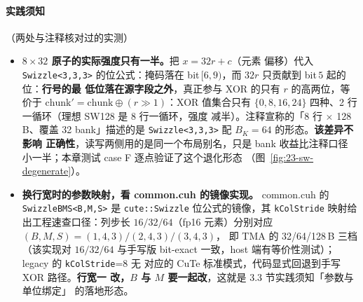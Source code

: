 \paragraph{实践须知}（两处与注释核对过的实测）
\begin{itemize}
  \item \textbf{$8\times32$ 原子的实际强度只有一半。}把 $x=32r+c$（元素
        偏移）代入 \texttt{Swizzle\allowbreak{}<3,\allowbreak{}3,\allowbreak{}3>} 的位公式：掩码落在
        bit$\,[6,9)$，而 $32r$ 只贡献到 bit$\,5$ 起的位：\textbf{行号的最
        低位落在源字段之外}，真正参与 XOR 的只有 $r$ 的高两位，等价于
        $\text{chunk}'=\text{chunk}\oplus(r\gg1)$：XOR 值集合只有
        $\{0,8,16,24\}$ 四种、2 行一循环（理想 SW128 是 8 行一循环，强度
        减半）。注释宣称的「8 行 $\times$ 128\,B、覆盖 32 bank」描述的是
        \texttt{Swizzle\allowbreak{}<3,\allowbreak{}3,\allowbreak{}3>} 配 $B_K=64$ 的形态。\textbf{该差异不影响
        正确性}，读写两侧用的是同一个布局别名，只是 bank 收益比注释口径
        小一半；本章测试 case F 逐点验证了这个退化形态
        （图~\ref{fig:23-sw-degenerate}）。
  \item \textbf{换行宽时的参数映射，看 common.cuh 的镜像实现。}
        common.cuh 的 \texttt{Swizzle\allowbreak{}BMS\allowbreak{}<B,\allowbreak{}M,\allowbreak{}S>} 是 \texttt{cute::\allowbreak{}Swizzle}
        位公式的镜像，其 \texttt{kColStride} 映射给出工程速查口径：列步长
        $16/32/64$（fp16 元素）分别对应 $(B,M,S)=(1,4,3)/(2,4,3)/(3,4,3)$，
        即 TMA 的 32/64/128\,B 三档（该实现对 $16/32/64$ 与手写版 bit-exact
        一致，host 端有等价性测试）；legacy 的 \texttt{kColStride}=8 无
        对应的 CuTe 标准模式，代码显式回退到手写 XOR 路径。\textbf{行宽一
        改，$B$ 与 $M$ 要一起改}，这就是 3.3 节实践须知「参数与单位绑定」
        的落地形态。
\end{itemize}

